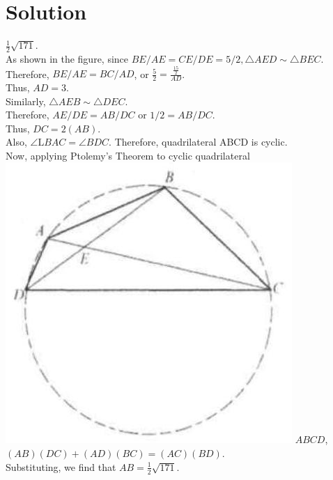 \documentclass{article}
\begin{document}
\section*{Solution}
\(\frac{1}{2} \sqrt{171}\).\\
As shown in the figure, since \(B E / A E=C E / D E=5 / 2, \triangle A E D \sim \triangle B E C\). Therefore, \(B E / A E=B C / A D\), or \(\frac{5}{2}=\frac{\frac{15}{2}}{A D}\).\\
Thus, \(A D=3\).\\
Similarly, \(\triangle A E B \sim \triangle D E C\).\\
Therefore, \(A E / D E=A B / D C\) or \(1 / 2=A B / D C\).\\
Thus, \(D C=2(A B)\).\\
Also, \(\angle \mathrm{L} B A C=\angle B D C\). Therefore, quadrilateral ABCD is cyclic.\\
Now, applying Ptolemy's Theorem to cyclic quadrilateral\\
\includegraphics[width=\textwidth]{images/reasoning_image_1.jpg} \(A B C D\), \((A B)(D C)+(A D)(B C)=(A C)(B D)\).\\
Substituting, we find that \(A B=\frac{1}{2} \sqrt{171}\).
\end{document}
